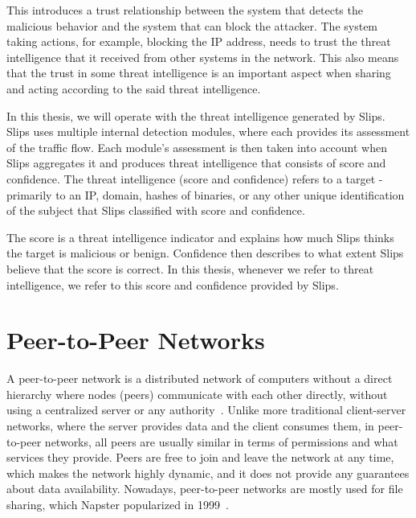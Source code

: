 This introduces a trust relationship between the system that detects the malicious behavior and the system that can block the attacker.
The system taking actions, for example, blocking the IP address, needs to trust the threat intelligence that it received from other systems in the network.
This also means that the trust in some threat intelligence is an important aspect when sharing and acting according to the said threat intelligence.

In this thesis, we will operate with the threat intelligence generated by Slips.
Slips uses multiple internal detection modules, where each provides its assessment of the traffic flow. 
Each module's assessment is then taken into account when Slips aggregates it and produces threat intelligence that consists of score and confidence.
The threat intelligence (score and confidence) refers to a target - primarily to an IP, domain, hashes of binaries, or any other unique identification of the subject that Slips classified with score and confidence.

The score is a threat intelligence indicator and explains how much Slips thinks the target is malicious or benign.
Confidence then describes to what extent Slips believe that the score is correct.
In this thesis, whenever we refer to threat intelligence, we refer to this score and confidence provided by Slips.

\section{Peer-to-Peer Networks}
\label{sec:peer-to-peer-networks}
A peer-to-peer network is a distributed network of computers without a direct hierarchy where nodes (peers) communicate with each other directly, without using a centralized server or any authority~\cite{schollmeier}.
Unlike more traditional client-server networks, where the server provides data and the client consumes them, in peer-to-peer networks, all peers are usually similar in terms of permissions and what services they provide.
Peers are free to join and leave the network at any time, which makes the network highly dynamic, and it does not provide any guarantees about data availability.
Nowadays, peer-to-peer networks are mostly used for file sharing, which Napster popularized in 1999~\cite{saroiu}.